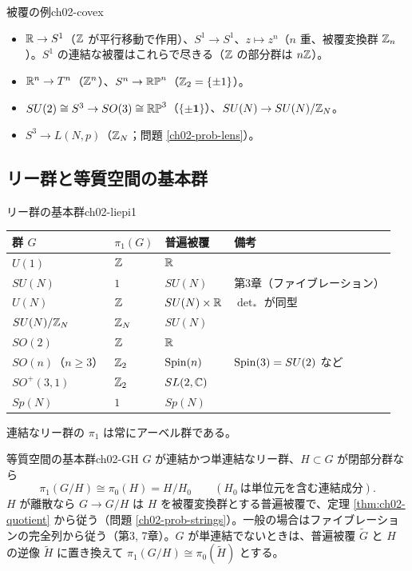 \begin{myex}{被覆の例}{ch02-covex}
\begin{itemize}
\item $\mathbb{R}\to S^1$（$\mathbb{Z}$ が平行移動で作用）、$S^1\to S^1$、$z\mapsto z^n$（$n$ 重、被覆変換群 $\mathbb{Z}_n$）。$S^1$ の連結な被覆はこれらで尽きる（$\mathbb{Z}$ の部分群は $n\mathbb{Z}$）。
\item $\mathbb{R}^n\to T^n$（$\mathbb{Z}^n$）、$S^n\to\mathbb{RP}^n$（$\mathbb{Z}_2=\{\pm1\}$）。
\item $SU(2)\cong S^3\to SO(3)\cong\mathbb{RP}^3$（$\{\pm\mathbf 1\}$）、$SU(N)\to SU(N)/\mathbb{Z}_N$。
\item $S^3\to L(N,p)$（$\mathbb{Z}_N$；問題 \ref{ch02-prob-lens}）。
\end{itemize}
\end{myex}

\subsection{リー群と等質空間の基本群}

\begin{myprop}{リー群の基本群}{ch02-liepi1}
\begin{center}
\renewcommand{\arraystretch}{1.25}
\begin{tabular}{llll}
群 $G$ & $\pi_1(G)$ & 普遍被覆 & 備考\\ \hline
$U(1)$ & $\mathbb{Z}$ & $\mathbb{R}$ & \\
$SU(N)$ & $1$ & $SU(N)$ & 第3章（ファイブレーション）\\
$U(N)$ & $\mathbb{Z}$ & $SU(N)\times\mathbb{R}$ & $\det_*$ が同型\\
$SU(N)/\mathbb{Z}_N$ & $\mathbb{Z}_N$ & $SU(N)$ & \\
$SO(2)$ & $\mathbb{Z}$ & $\mathbb{R}$ & \\
$SO(n)$（$n\ge3$） & $\mathbb{Z}_2$ & $\operatorname{Spin}(n)$ & $\operatorname{Spin}(3)=SU(2)$ など\\
$SO^+(3,1)$ & $\mathbb{Z}_2$ & $SL(2,\mathbb{C})$ & \\
$Sp(N)$ & $1$ & $Sp(N)$ &
\end{tabular}
\end{center}
連結なリー群の $\pi_1$ は常にアーベル群である。
\end{myprop}

\begin{mythm}{等質空間の基本群}{ch02-GH}
$G$ が連結かつ単連結なリー群、$H\subset G$ が閉部分群なら
\[
\pi_1(G/H)\cong\pi_0(H)=H/H_0\qquad(H_0\ \text{は単位元を含む連結成分}).
\]
$H$ が離散なら $G\to G/H$ は $H$ を被覆変換群とする普遍被覆で、定理 \ref{thm:ch02-quotient} から従う（問題 \ref{ch02-prob-strings}）。一般の場合はファイブレーションの完全列から従う（第3, 7章）。$G$ が単連結でないときは、普遍被覆 $\tilde G$ と $H$ の逆像 $\tilde H$ に置き換えて $\pi_1(G/H)\cong\pi_0(\tilde H)$ とする。
\end{mythm}

